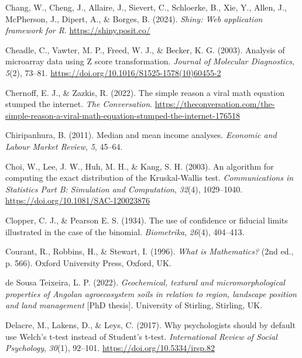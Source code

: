 \documentclass[
  openany]{krantz}
\newlength{\cslhangindent}
\newlength{\cslentryspacingunit} %
\newenvironment{CSLReferences}[2] %
 {%
  \setlength{\parindent}{0pt}
  \ifodd #1
  \let\oldpar\par
  \def\par{\hangindent=\cslhangindent\oldpar}
  \fi
  \setlength{\parskip}{#2\cslentryspacingunit}
 }%
 {}
\begin{document}
\begin{CSLReferences}{1}{0}
\leavevmode{}%
Chang, W., Cheng, J., Allaire, J., Sievert, C., Schloerke, B., Xie, Y., Allen, J., McPherson, J., Dipert, A., \& Borges, B. (2024). \emph{Shiny: Web application framework for {R}}. \url{https://shiny.posit.co/}

\leavevmode{}%
Cheadle, C., Vawter, M. P., Freed, W. J., \& Becker, K. G. (2003). {Analysis of microarray data using Z score transformation}. \emph{Journal of Molecular Diagnostics}, \emph{5}(2), 73--81. \url{https://doi.org/10.1016/S1525-1578(10)60455-2}

\leavevmode{}%
Chernoff, E. J., \& Zazkis, R. (2022). {The simple reason a viral math equation stumped the internet}. \emph{The Conversation}. \url{https://theconversation.com/the-simple-reason-a-viral-math-equation-stumped-the-internet-176518}

\leavevmode{}%
Chiripanhura, B. (2011). {Median and mean income analyses}. \emph{Economic and Labour Market Review}, \emph{5}, 45--64.

\leavevmode{}%
Choi, W., Lee, J. W., Huh, M. H., \& Kang, S. H. (2003). {An algorithm for computing the exact distribution of the Kruskal-Wallis test}. \emph{Communications in Statistics Part B: Simulation and Computation}, \emph{32}(4), 1029--1040. \url{https://doi.org/10.1081/SAC-120023876}

\leavevmode{}%
Clopper, C. J., \& Pearson E. S. (1934). {The use of confidence or fiducial limits illustrated in the case of the binomial}. \emph{Biometrika}, \emph{26}(4), 404--413.

\leavevmode{}%
Courant, R., Robbins, H., \& Stewart, I. (1996). \emph{{What is Mathematics?}} (2nd ed., p. 566). Oxford University Press, Oxford, UK.

\leavevmode{}%
de Sousa Teixeira, L. P. (2022). \emph{Geochemical, textural and micromorphological properties of {A}ngolan agroecosystem soils in relation to region, landscape position and land management} {[}PhD thesis{]}. University of Stirling, Stirling, UK.

\leavevmode{}%
Delacre, M., Lakens, D., \& Leys, C. (2017). {Why psychologists should by default use Welch's t-test instead of Student's t-test}. \emph{International Review of Social Psychology}, \emph{30}(1), 92--101. \url{https://doi.org/10.5334/irsp.82}


\end{CSLReferences}
\end{document}
